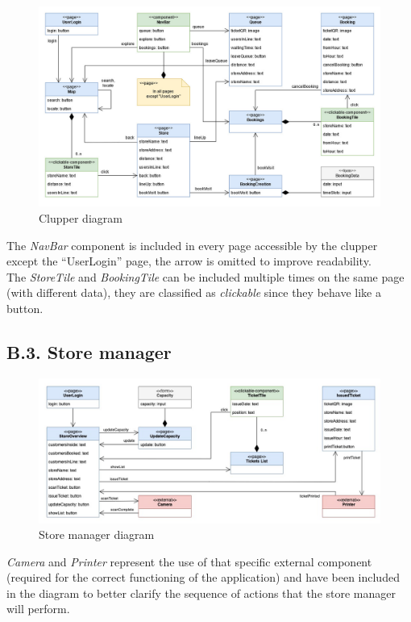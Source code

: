 \begin{figure}[H]
\centering
\includegraphics{ux_diagrams/ux_clupper}
\caption{Clupper diagram}
\end{figure}

The \emph{NavBar} component is included in every page accessible by the clupper except the ``UserLogin'' page, the arrow is omitted to improve readability.\\
The \emph{StoreTile} and \emph{BookingTile} can be included multiple times on the same page (with different data), they are classified as \emph{clickable} since they behave like a button.

\subsection{B.3. Store manager}

\begin{figure}[H]
\centering
\includegraphics{ux_diagrams/ux_store_manager}
\caption{Store manager diagram}
\end{figure}

\emph{Camera} and \emph{Printer} represent the use of that specific external component (required for the correct functioning of the application) and have been included in the diagram to better clarify the sequence of actions that the store manager will perform.

